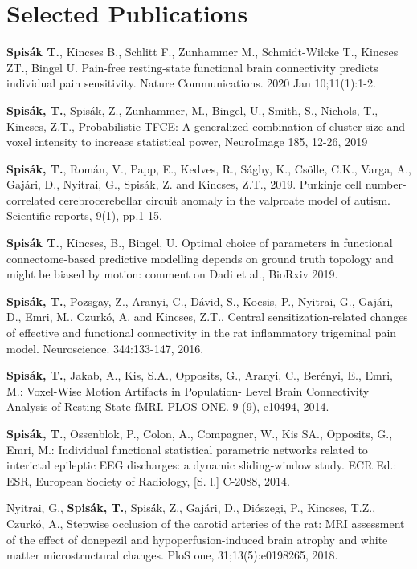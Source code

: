 \documentclass[12pt,a4paper,roman]{moderncv}        %
\begin{document}
\newpage

\section{Selected Publications}
\textbf{Spis\'ak T.}, Kincses B., Schlitt F., Zunhammer M., Schmidt-Wilcke T., Kincses ZT., Bingel U. Pain-free resting-state functional brain connectivity predicts individual pain sensitivity. Nature Communications. 2020 Jan 10;11(1):1-2.

\textbf{Spis\'ak, T.}, Spis\'ak, Z., Zunhammer, M., Bingel, U., Smith, S., Nichols, T., Kincses, Z.T., Probabilistic TFCE: A generalized combination of cluster size and voxel intensity to increase statistical power, NeuroImage 185, 12-26, 2019

\textbf{Spis\'ak, T.}, Román, V., Papp, E., Kedves, R., Sághy, K., Csölle, C.K., Varga, A., Gajári, D., Nyitrai, G., Spisák, Z. and Kincses, Z.T., 2019. Purkinje cell number-correlated cerebrocerebellar circuit anomaly in the valproate model of autism. Scientific reports, 9(1), pp.1-15.

\textbf{Spis\'ak T.}, Kincses, B., Bingel, U. Optimal choice of parameters in functional connectome-based predictive modelling depends on ground truth topology and might be biased by motion: comment on Dadi et al., BioRxiv 2019.

\textbf{Spis\'ak, T.}, Pozsgay, Z., Aranyi, C., D\'avid, S., Kocsis, P., Nyitrai, G., Gaj\'ari, D., Emri, M., Czurk\'o, A. and Kincses, Z.T., Central sensitization-related changes of effective and functional connectivity in the rat inflammatory trigeminal pain model. Neuroscience. 344:133-147, 2016.

\textbf{Spis\'ak, T.}, Jakab, A., Kis, S.A., Opposits, G., Aranyi, C., Ber\'enyi, E., Emri, M.: Voxel-Wise Motion Artifacts in Population- Level Brain Connectivity Analysis of Resting-State fMRI. PLOS ONE. 9 (9), e10494, 2014.

\textbf{Spis\'ak, T.}, Ossenblok, P., Colon, A., Compagner, W., Kis SA., Opposits, G., Emri, M.: Individual functional statistical parametric networks related to interictal epileptic EEG discharges: a dynamic sliding-window study. ECR Ed.: ESR, European Society of Radiology, [S. l.] C-2088, 2014.

Nyitrai, G., \textbf{Spis\'ak, T.}, Spis\'ák, Z., Gaj\'ari, D., Di\'oszegi, P., Kincses, T.Z., Czurk\'o, A., Stepwise occlusion of the carotid arteries of the rat: MRI assessment of the effect of donepezil and hypoperfusion-induced brain atrophy and white matter microstructural changes. PloS one, 31;13(5):e0198265, 2018.
\end{document}
